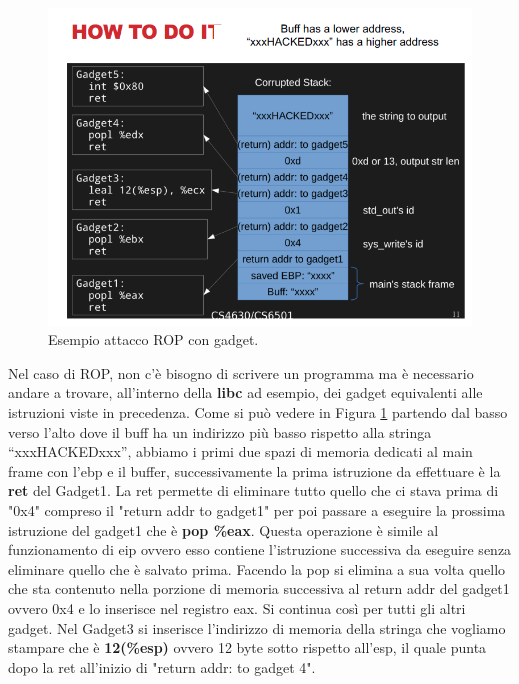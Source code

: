 \begin{figure}[H]
	\centering
    \includegraphics[width=14cm, keepaspectratio]{santini/img/cap_3/es_attacco_rop_gadget.png}
	\caption{Esempio attacco ROP con gadget.}\label{fig:es_attacco_rop_gadget}
\end{figure}

Nel caso di ROP, non c'è bisogno di scrivere un programma ma è necessario andare a trovare, all'interno della \textbf{libc} ad esempio, dei gadget equivalenti alle istruzioni viste in precedenza. Come si può vedere in Figura \ref{fig:es_attacco_rop_gadget} partendo dal basso verso l'alto dove il buff ha un indirizzo più basso rispetto alla stringa “xxxHACKEDxxx”, abbiamo i primi due spazi di memoria dedicati al main frame con l'ebp e il buffer, successivamente la prima istruzione da effettuare è la \textbf{ret} del Gadget1. La ret permette di eliminare tutto quello che ci stava prima di "0x4" compreso il "return addr to gadget1" per poi passare a eseguire la prossima istruzione del gadget1 che è \textbf{pop \%eax}. Questa operazione è simile al funzionamento di eip ovvero esso contiene l'istruzione successiva da eseguire senza eliminare quello che è salvato prima. Facendo la pop si elimina a sua volta quello che sta contenuto nella porzione di memoria successiva al return addr del gadget1 ovvero 0x4 e lo inserisce nel registro eax. Si continua così per tutti gli altri gadget. Nel Gadget3 si inserisce l'indirizzo di memoria della stringa che vogliamo stampare che è \textbf{12(\%esp)} ovvero 12 byte sotto rispetto all'esp, il quale punta dopo la ret all'inizio di "return addr: to gadget 4".

